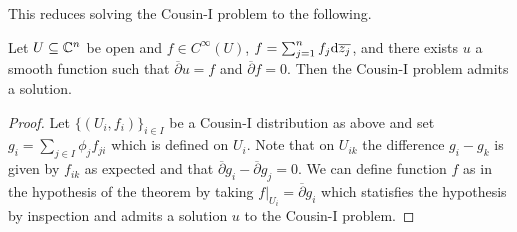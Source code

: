 This reduces solving the Cousin-I problem to the following. 
\begin{proposition}\label{prop: Cousin-I is CR01}
    Let $U\subseteq\mathbb{C}^{n}$ be open and $f\in C^{\infty}(U)$, $f=\sum_{j=1}^{n}f_{j}\mathrm{d}\overline{z_{j}}$, and there exists $u$ a smooth function such that $\overline{\partial}u=f$ and $\overline{\partial}f=0$. Then the Cousin-I problem admits a solution.
\end{proposition}
\begin{proof}
    Let $\{(U_{i},f_{i})\}_{i\in I}$ be a Cousin-I distribution as above and set $g_{i}=\sum_{j\in I}\phi_{j}f_{ji}$ which is defined on $U_{i}$. Note that on $U_{ik}$ the difference $g_{i}-g_{k}$ is given by $f_{ik}$ as expected and that $\overline{\partial}g_{i}-\overline{\partial}g_{j}=0$. We can define function $f$ as in the hypothesis of the theorem by taking $f|_{U_{i}}=\overline{\partial}g_{i}$ which statisfies the hypothesis by inspection and admits a solution $u$ to the Cousin-I problem. 
\end{proof}